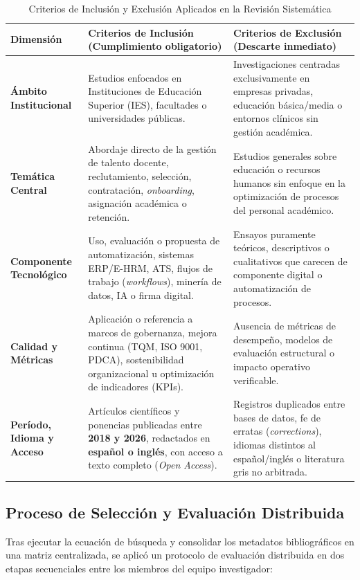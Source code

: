\documentclass[conference]{IEEEtran}
\begin{document}
\begin{table}[htbp]
\caption{Criterios de Inclusión y Exclusión Aplicados en la Revisión Sistemática}
\label{tab:criterios_elegibilidad}
\centering
\renewcommand{\arraystretch}{1.25}
\begin{tabularx}{\textwidth}{>{\bfseries}p{2.8cm} X X}
\toprule
\textbf{Dimensión} & \textbf{Criterios de Inclusión (Cumplimiento obligatorio)} & \textbf{Criterios de Exclusión (Descarte inmediato)} \\
\midrule
Ámbito Institucional & Estudios enfocados en Instituciones de Educación Superior (IES), facultades o universidades públicas. & Investigaciones centradas exclusivamente en empresas privadas, educación básica/media o entornos clínicos sin gestión académica. \\
\midrule
Temática Central & Abordaje directo de la gestión de talento docente, reclutamiento, selección, contratación, \textit{onboarding}, asignación académica o retención. & Estudios generales sobre educación o recursos humanos sin enfoque en la optimización de procesos del personal académico. \\
\midrule
Componente Tecnológico & Uso, evaluación o propuesta de automatización, sistemas ERP/E-HRM, ATS, flujos de trabajo (\textit{workflows}), minería de datos, IA o firma digital. & Ensayos puramente teóricos, descriptivos o cualitativos que carecen de componente digital o automatización de procesos. \\
\midrule
Calidad y Métricas & Aplicación o referencia a marcos de gobernanza, mejora continua (TQM, ISO 9001, PDCA), sostenibilidad organizacional u optimización de indicadores (KPIs). & Ausencia de métricas de desempeño, modelos de evaluación estructural o impacto operativo verificable. \\
\midrule
Período, Idioma y Acceso & Artículos científicos y ponencias publicadas entre \textbf{2018 y 2026}, redactados en \textbf{español o inglés}, con acceso a texto completo (\textit{Open Access}). & Registros duplicados entre bases de datos, fe de erratas (\textit{corrections}), idiomas distintos al español/inglés o literatura gris no arbitrada. \\
\bottomrule
\end{tabularx}
\end{table}

\subsection{Proceso de Selección y Evaluación Distribuida}
Tras ejecutar la ecuación de búsqueda y consolidar los metadatos bibliográficos en una matriz centralizada, se aplicó un protocolo de evaluación distribuida en dos etapas secuenciales entre los miembros del equipo investigador:
\end{document}
